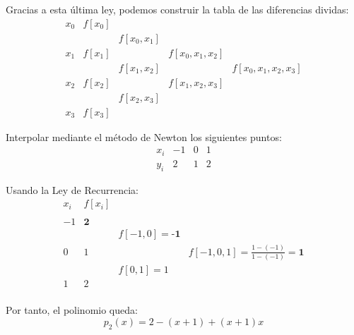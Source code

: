 \noindent
Gracias a esta última ley, podemos construir la tabla de las diferencias dividas:
$$\begin{array}{c|cccc}
        x_0 & f[x_0] &             &                &                    \\
            &        & f[x_0,x_1]  &                &                    \\
        x_1 & f[x_1] &             & f[x_0,x_1,x_2] &                    \\
            &        & f[x_1,x_2]  &                & f[x_0,x_1,x_2,x_3] \\
        x_2 & f[x_2] &             & f[x_1,x_2,x_3] &                    \\
            &        & f[x_2, x_3] &                &                    \\
        x_3 & f[x_3] &             &                &
    \end{array}$$

\begin{ejemplo}
    Interpolar mediante el método de Newton los siguientes puntos:
    \begin{equation*}
        \begin{array}{c|ccc}
            x_i & -1 & 0 & 1 \\ \hline
            y_i & 2 & 1 & 2
        \end{array}
    \end{equation*}

    Usando la Ley de Recurrencia:
    \begin{equation*}
        \begin{array}{c|ccc}
            x_i & f[x_i] \\
            \\
            -1 & \textbf{2} \\
            && f[-1, 0] = \textbf{-1}\\
            0 & 1 & & f[-1, 0, 1] = \frac{1-(-1)}{1-(-1)} = \textbf{1}\\
            && f[0, 1] = 1\\
            1 & 2 \\
        \end{array}
    \end{equation*}

    Por tanto, el polinomio queda:
    \begin{equation*}
        p_2(x) = 2-(x+1)+(x+1)x
    \end{equation*}
\end{ejemplo}

